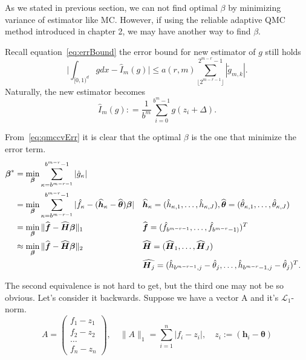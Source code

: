 
As we stated in previous section, we can not find optimal $\beta$ by minimizing variance of estimator like MC. 
However, if using the reliable adaptive QMC method introduced in chapter 2, we may have another way to find $\beta$.

Recall equation~\eqref{eq:errBound} the error bound for new estimator of $g$ still holds
\begin{equation}\label{eq:qmccvErr}
	\Big|\int_{[0,1)^d}gdx - \hat{I}_m(g)\Big| \leq a(r,m) \sum_{\lfloor 2^{m-r-1} \rfloor}^{2^{m-r}-1} |\tilde{g}_{m,k}|.
\end{equation}
Naturally, the new estimator becomes
\begin{equation}\label{eq:estcv}
    \hat{I}_m({g}): = \frac{1}{b^m}\sum_{i=0}^{b^m-1}g(z_i+\Delta).
\end{equation}


From~\eqref{eq:qmccvErr} it is clear that the optimal $\beta$ is the one that minimize the error term. 
\begin{align}
    \label{eq:optbeta1}
    \boldsymbol{\beta}^*
    &=\min_{\boldsymbol{\beta}}\sum_{\kappa=b^{m-r-1}}^{b^{m-r}-1} |\hat{g}_{\kappa}|\\
    \label{eq:optbeta2}
    &=\min_{\boldsymbol{\beta}}\sum_{\kappa=b^{m-r-1}}^{b^{m-r}-1}|\hat{f}_\kappa
    -(\widehat{\boldsymbol{h}}_\kappa - \widehat{\boldsymbol{\theta}})\boldsymbol{\boldsymbol{\beta}}|
    && \widehat{\boldsymbol{h}}_\kappa=(\hat{h}_{\kappa,1},\dots, \hat{h}_{\kappa,J}),
    \widehat{\boldsymbol{\theta}}=(\hat{\theta}_{\kappa,1},\dots,\hat{\theta}_{\kappa,J})\\
    \label{eq:optbeta3}
    &=\min_{\boldsymbol{\beta}}\|\widehat{\boldsymbol{f}}-\widehat{\boldsymbol{H}}\boldsymbol{\beta}\|_1
    && \widehat{\boldsymbol{f}}= (\hat{f}_{b^{m-r-1}},\dots,\hat{f}_{b^{m-r}-1)})^T \\
    \label{eq:optbeta4}
    &\approx\min_{\boldsymbol{\beta}}\|\widehat{\boldsymbol{f}}-\widehat{\boldsymbol{H}}\boldsymbol{\beta}\|_2
    && \widehat{\boldsymbol{H}}= (\widehat{\boldsymbol{H}}_1, \dots, \widehat{\boldsymbol{H}}_J)\\
    & \notag 
    &&\widehat{\boldsymbol{H}_j}=(\hat{h}_{b^{m-r-1},j}-\hat{\theta}_j,\dots, \hat{h}_{b^{m-r}-1,j}-\hat{\theta}_j)^T.
\end{align}

The second equivalence is not hard to get, but the third one may not be so obvious. Let's consider it backwards. Suppose we have a vector A and it's $\mathcal{L}_1$-norm.
\[
   A=
    \begin{pmatrix}
        f_1-z_1\\
        f_2-z_2\\
        \hdots\\
        f_n-z_n
    \end{pmatrix},\quad
    \|A\|_1=\sum_{i=1}^{n}|f_i-z_i|, \quad
    z_i:=(\boldsymbol{h}_i-\boldsymbol{\theta})
\]

